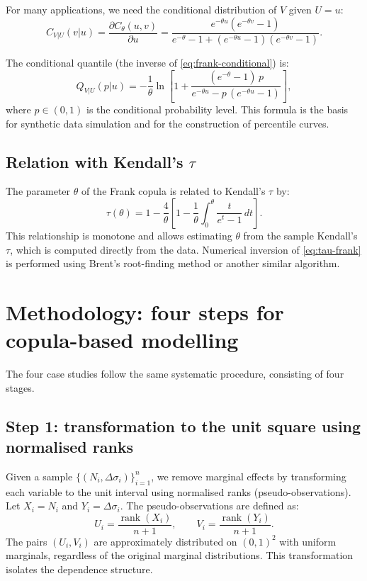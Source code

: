 For many applications, we need the conditional distribution of \(V\) given \(U = u\):
\begin{equation}
C_{V|U}(v|u) = \frac{\partial C_\theta(u,v)}{\partial u} = \frac{e^{-\theta u}(e^{-\theta v} - 1)}{e^{-\theta} - 1 + (e^{-\theta u} - 1)(e^{-\theta v} - 1)}.
\label{eq:frank-conditional}
\end{equation}

The conditional quantile (the inverse of \eqref{eq:frank-conditional}) is:
\begin{equation}
Q_{V|U}(p|u) = -\frac{1}{\theta}\ln\left[1+\frac{(e^{-\theta}-1)\,p}{e^{-\theta u}-p\,(e^{-\theta u}-1)}\right],
\label{eq:frank-quantile}
\end{equation}
where \(p \in (0,1)\) is the conditional probability level. This formula is the basis for synthetic data simulation and for the construction of percentile curves.

\subsection{Relation with Kendall's \(\tau\)}

The parameter \(\theta\) of the Frank copula is related to Kendall's \(\tau\) by:
\begin{equation}
\tau(\theta) = 1 - \frac{4}{\theta}\left[1 - \frac{1}{\theta}\int_0^\theta \frac{t}{e^t - 1}\,dt\right].
\label{eq:tau-frank}
\end{equation}
This relationship is monotone and allows estimating \(\theta\) from the sample Kendall's \(\tau\), which is computed directly from the data. Numerical inversion of \eqref{eq:tau-frank} is performed using Brent's root-finding method or another similar algorithm.

\section{Methodology: four steps for copula-based modelling}
\label{sec:methodology-copula}

The four case studies follow the same systematic procedure, consisting of four stages.

\subsection{Step 1: transformation to the unit square using normalised ranks}

Given a sample \(\{(N_i,\Delta\sigma_i)\}_{i=1}^n\), we remove marginal effects by transforming each variable to the unit interval using normalised ranks (pseudo-observations). Let \(X_i = N_i\) and \(Y_i = \Delta\sigma_i\). The pseudo-observations are defined as:
\begin{equation}
U_i = \frac{\operatorname{rank}(X_i)}{n+1}, \qquad V_i = \frac{\operatorname{rank}(Y_i)}{n+1}.
\label{eq:pseudo-obs}
\end{equation}
The pairs \((U_i,V_i)\) are approximately distributed on \((0,1)^2\) with uniform marginals, regardless of the original marginal distributions. This transformation isolates the dependence structure.

